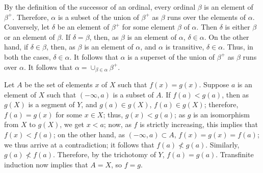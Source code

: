 \documentclass{article}
\begin{document}
\begin{solution}[\ref{exe:qgdrw0j7}]
  \label{sol:pfhq76oe}
  By the definition of the successor of an ordinal, every ordinal
  \(\beta\) is an element of \(\beta^+\).  Therefore, \(\alpha\) is a
  subset of the union of \(\beta^+\) as \(\beta\) runs over the
  elements of \(\alpha\).  Conversely, let \(\delta\) be an element of
  \(\beta^+\) for some element \(\beta\) of \(\alpha\).  Then
  \(\delta\) is either \(\beta\) or an element of \(\beta\).  If
  \(\delta = \beta\), then, as \(\beta\) is an element of \(\alpha\),
  \(\delta \in \alpha\).  On the other hand, if \(\delta \in \beta\),
  then, as \(\beta\) is an element of \(\alpha\), and \(\alpha\) is
  transitive, \(\delta \in \alpha\).  Thus, in both the cases,
  \(\delta \in \alpha\).  It follows that \(\alpha\) is a superset of
  the union of \(\beta^+\) as \(\beta\) runs over \(\alpha\).  It
  follows that \(\alpha = \cup_{\beta \in \alpha}\beta^+\).
\end{solution}

\begin{solution}[\ref{exe:owfnmkbo}]
  \label{sol:wcch8wta}
  Let \(A\) be the set of elements \(x\) of \(X\) such that
  \(f(x) = g(x)\).  Suppose \(a\) is an element of \(X\) such that
  \((-\infty, a)\) is a subset of \(A\).  If \(f(a) < g(a)\), then as
  \(g(X)\) is a segment of \(Y\), and \(g(a) \in g(X)\),
  \(f(a) \in g(X)\); therefore, \(f(a) = g(x)\) for some \(x \in X\);
  thus, \(g(x) < g(a)\); as \(g\) is an isomorphism from \(X\) to
  \(g(X)\), we get \(x < a\); now, as \(f\) is strictly increasing,
  this implies that \(f(x) < f(a)\); on the other hand, as
  \((-\infty, a) \subset A\), \(f(x) = g(x) = f(a)\); we thus arrive
  at a contradiction; it follows that \(f(a) \nless g(a)\).
  Similarly, \(g(a) \nless f(a)\).  Therefore, by the trichotomy of
  \(Y\), \(f(a) = g(a)\).  Transfinite induction 
  now implies that \(A = X\), so \(f = g\).
\end{solution}
\end{document}
